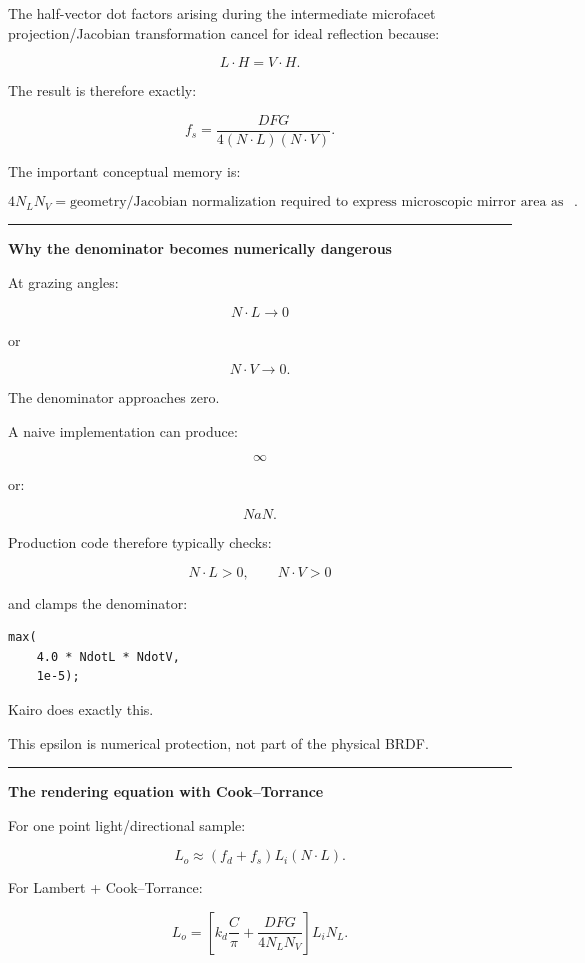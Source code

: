 The half-vector dot factors arising during the intermediate microfacet projection/Jacobian transformation cancel for ideal reflection because:

\[
L\cdot H=V\cdot H.
\]

The result is therefore exactly:

\[
f_s=
\frac{DFG}
{4(N\cdot L)(N\cdot V)}.
\]

The important conceptual memory is:

\[
\boxed{
4N_LN_V
=
\text{geometry/Jacobian normalization required to express microscopic mirror area as a macroscopic BRDF}.
}
\]

\begin{center}\rule{0.5\linewidth}{0.5pt}\end{center}

\textbf{Why the denominator becomes numerically dangerous}

At grazing angles:

\[
N\cdot L\rightarrow0
\]

or

\[
N\cdot V\rightarrow0.
\]

The denominator approaches zero.

A naive implementation can produce:

\[
\infty
\]

or:

\[
NaN.
\]

Production code therefore typically checks:

\[
N\cdot L>0,
\qquad
N\cdot V>0
\]

and clamps the denominator:

\begin{verbatim}
max(
    4.0 * NdotL * NdotV,
    1e-5);
\end{verbatim}

Kairo does exactly this.

This epsilon is numerical protection, not part of the physical BRDF.

\begin{center}\rule{0.5\linewidth}{0.5pt}\end{center}

\textbf{The rendering equation with Cook--Torrance}

For one point light/directional sample:

\[
L_o
\approx
\left(
f_d+f_s
\right)
L_i
(N\cdot L).
\]

For Lambert + Cook--Torrance:

\[
L_o
=
\left[
k_d\frac{C}{\pi}
+
\frac{DFG}
{4N_LN_V}
\right]
L_iN_L.
\]

